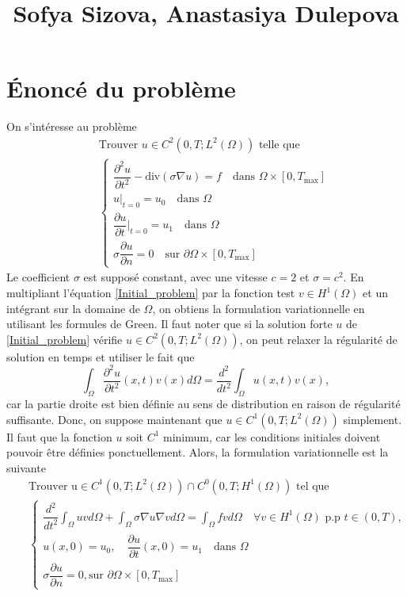\documentclass[12pt]{article}
\newcommand{\pd}[2]{ %
	\dfrac{\partial #1}{\partial #2}
}
\begin{document}
	
	\tableofcontents
	\title{Sofya Sizova, Anastasiya Dulepova}
	\maketitle
	\section{Énoncé du problème}
	On s'intéresse au problème 
	\begin{eqnarray} 
	\nonumber
	& &\text{Trouver } u \in C^2(0, T; L^2(\Omega)) \text{ telle que}\\[2mm]
	& &\begin{cases} \label{Initial_problem}
	\dfrac{\partial^2u}{\partial t^2} - \text{div} (\sigma\nabla u) = f \quad  \text{dans } \Omega \times [0, T_\text{max}]\\
	u|_{t = 0} = u_0 \quad \text{dans } \Omega \\
	\pd{u}{t}|_{t = 0} = u_1 \quad \text{dans } \Omega \\
	\sigma \pd{u}{n} = 0 \quad \text{sur } \partial\Omega \times [0, T_\text{max}]
	\end{cases}
	\end{eqnarray}
	Le coefficient $\sigma$ est supposé constant, avec une vitesse $c = 2$ et $\sigma = c^2$. 
	En multipliant l'équation \eqref{Initial_problem} par la fonction test $v \in H^1(\Omega)$ et un intégrant sur la domaine de $\Omega$, on obtiens la formulation variationnelle en utilisant les formules de Green. Il faut noter que si la solution forte $u$ de \eqref{Initial_problem} vérifie $u \in C^2(0, T; L^2(\Omega))$, on peut relaxer la régularité de solution en temps et utiliser le fait que
	\begin{equation*}
	\int_\Omega{\dfrac{\partial^2u}{\partial t^2}(x,t) v(x)d\Omega} = \frac{d^2}{dt^2} \int_\Omega{u(x,t) v(x)},
	\end{equation*}
	car la partie droite est bien définie au sens de distribution en raison de régularité suffisante. Donc, on suppose maintenant que $u \in C^1(0, T; L^2(\Omega))$ simplement. Il faut que la fonction $u$ soit $C^1$ minimum, car les conditions initiales doivent pouvoir être définies ponctuellement.  Alors, la formulation variationnelle est la suivante
	\begin{eqnarray}
	\nonumber
	& &\text{Trouver u} \in C^1(0, T; L^2(\Omega)) \cap C^0(0, T; H^1(\Omega)) \text { tel que}\\
	& &\begin{cases} \nonumber
	\dfrac{d^2}{dt^2} \int_\Omega {u v d\Omega} + \int_\Omega{\sigma \nabla u \nabla v d\Omega} = \int_\Omega{f v d\Omega} \quad \forall v \in H^1(\Omega) \text{ p.p } t \in (0,T),\\
	u(x, 0) = u_0, \quad \pd{u}{t}(x,0) = u_1 \quad \text{dans } \Omega \\
	\sigma \pd{u}{n} = 0, \text{sur } \partial\Omega \times [0, T_\text{max}]
	\end{cases}
	\end{eqnarray}
	
\end{document}
